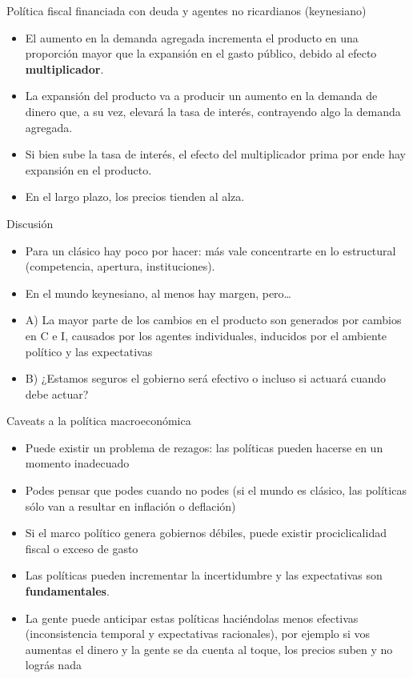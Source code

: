 \documentclass{beamer}
\begin{document}
\begin{frame}{Política fiscal financiada con deuda y agentes no ricardianos (keynesiano)}
   
    \begin{itemize}
        \item El aumento en la demanda agregada incrementa el producto en una proporción mayor que la expansión en el gasto público, debido al efecto \textbf{multiplicador}.
        \item La expansión del producto va a producir un aumento en la demanda de dinero que, a su vez, elevará la tasa de interés, contrayendo algo la demanda agregada.
        \item Si bien sube la tasa de interés, el efecto del multiplicador prima por ende hay expansión en el producto.
        \item En el largo plazo, los precios tienden al alza.
    \end{itemize}
\end{frame}


\begin{frame}{Discusión}

    \begin{itemize}
    \item Para un clásico hay poco por hacer: más vale concentrarte en lo estructural (competencia, apertura, instituciones).
    \item En el mundo keynesiano, al menos hay margen, pero…
    \item A) La mayor parte de los cambios en el producto son generados por cambios en C e I, causados por los agentes individuales, inducidos por el ambiente político y las expectativas
    \item B) ¿Estamos seguros el gobierno será efectivo o incluso si actuará cuando debe actuar? 
    \end{itemize}

\end{frame}

\begin{frame}{Caveats a la política macroeconómica}
    \begin{itemize}
    \item Puede existir un problema de rezagos: las políticas pueden hacerse en un momento inadecuado
    \item Podes pensar que podes cuando no podes (si el mundo es clásico, las políticas sólo van a resultar en inflación o deflación)
    \item Si el marco político genera gobiernos débiles, puede existir prociclicalidad fiscal o exceso de gasto
    \item Las políticas pueden incrementar la incertidumbre y las expectativas son \textbf{fundamentales}.
    \item La gente puede anticipar estas políticas haciéndolas menos efectivas (inconsistencia temporal y expectativas racionales), por ejemplo si vos aumentas el dinero y la gente se da cuenta al toque, los precios suben y no lográs nada
    \end{itemize}
\end{frame}
\end{document}
